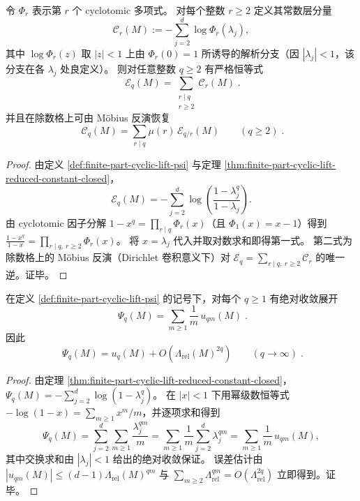 \begin{proposition}\label{prop:finite-part-cyclic-lift-cyclotomic-divisor-mobius}
令 \(\Phi_r\) 表示第 \(r\) 个 cyclotomic 多项式。
对每个整数 \(r\ge 2\) 定义其常数层分量
\[
\mathcal{C}_r(M):=-\sum_{j=2}^{d}\log \Phi_r(\lambda_j),
\]
其中 \(\log\Phi_r(z)\) 取 \(|z|<1\) 上由 \(\Phi_r(0)=1\) 所诱导的解析分支（因 \(|\lambda_j|<1\)，该分支在各 \(\lambda_j\) 处良定义）。
则对任意整数 \(q\ge 2\) 有严格恒等式
\[
\boxed{\;
\mathcal{E}_q(M)=\sum_{\substack{r\mid q\\ r\ge 2}}\mathcal{C}_r(M)\; }.
\]
并且在除数格上可由 Möbius 反演恢复
\[
\boxed{\;
\mathcal{C}_q(M)=\sum_{r\mid q}\mu(r)\,\mathcal{E}_{q/r}(M)\qquad(q\ge 2)\; }.
\]
\end{proposition}
\begin{proof}
由定义 \ref{def:finite-part-cyclic-lift-psi} 与定理 \ref{thm:finite-part-cyclic-lift-reduced-constant-closed}，
\[
\mathcal{E}_q(M)
=-\sum_{j=2}^{d}\log\!\left(\frac{1-\lambda_j^{q}}{1-\lambda_j}\right).
\]
由 cyclotomic 因子分解 \(1-x^{q}=\prod_{r\mid q}\Phi_r(x)\)（且 \(\Phi_1(x)=x-1\)）得到
\(
\frac{1-x^{q}}{1-x}=\prod_{r\mid q,\ r\ge 2}\Phi_r(x)
\)。
将 \(x=\lambda_j\) 代入并取对数求和即得第一式。
第二式为除数格上的 Möbius 反演（Dirichlet 卷积意义下）对 \(\mathcal{E}_q=\sum_{r\mid q,\ r\ge 2}\mathcal{C}_r\) 的唯一逆。证毕。
\end{proof}

\begin{proposition}\label{prop:finite-part-cyclic-lift-dirichlet-multiple-sum}
在定义 \ref{def:finite-part-cyclic-lift-psi} 的记号下，对每个 \(q\ge 1\) 有绝对收敛展开
\[
\boxed{\;
\Psi_q(M)=\sum_{m\ge 1}\frac{1}{m}\,u_{qm}(M)\; }.
\]
因此
\[
\boxed{\;
\Psi_q(M)=u_q(M)+O\!\left(\Lambda_{\mathrm{rel}}(M)^{2q}\right)\qquad(q\to\infty)\; }.
\]
\end{proposition}
\begin{proof}
由定理 \ref{thm:finite-part-cyclic-lift-reduced-constant-closed}，
\(
\Psi_q(M)=-\sum_{j=2}^{d}\log(1-\lambda_j^q)
\)。
在 \(|x|<1\) 下用幂级数恒等式 \(-\log(1-x)=\sum_{m\ge 1}x^m/m\)，并逐项求和得到
\[
\Psi_q(M)=\sum_{j=2}^{d}\sum_{m\ge 1}\frac{\lambda_j^{qm}}{m}
=\sum_{m\ge 1}\frac{1}{m}\sum_{j=2}^{d}\lambda_j^{qm}
=\sum_{m\ge 1}\frac{1}{m}\,u_{qm}(M),
\]
其中交换求和由 \(|\lambda_j|<1\) 给出的绝对收敛保证。
误差估计由
\(
|u_{qm}(M)|\le (d-1)\Lambda_{\mathrm{rel}}(M)^{qm}
\)
与
\(
\sum_{m\ge 2}\Lambda_{\mathrm{rel}}^{qm}=O(\Lambda_{\mathrm{rel}}^{2q})
\)
立即得到。证毕。
\end{proof}

